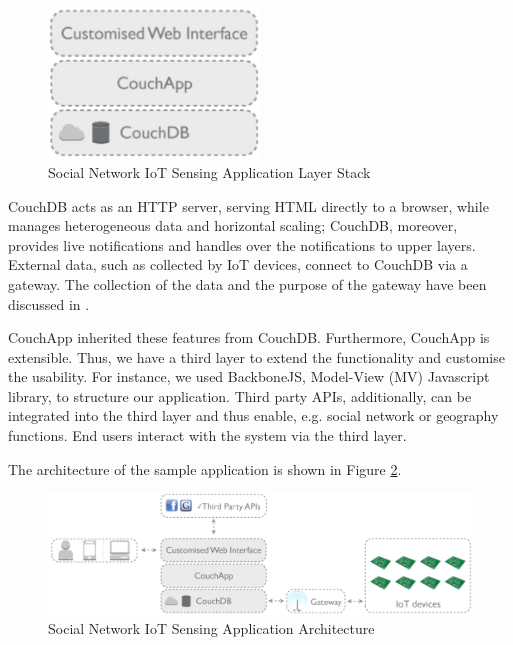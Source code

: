 \begin{figure}[ht]
  \begin{center}
    \includegraphics[width=0.5\textwidth]{images/data-centre-app-stack.pdf}
    \caption{Social Network IoT Sensing Application Layer Stack}
    \label{fig:data-centre-app-stack}
  \end{center}
\end{figure}

CouchDB acts as an HTTP server, serving HTML directly to a browser, while manages heterogeneous data and horizontal scaling; CouchDB, moreover, provides live notifications and handles over the notifications to upper layers. External data, such as collected by IoT devices, connect to CouchDB via a gateway. The collection of the data and the purpose of the gateway have been discussed in \cite{francesco2012storage}. 

CouchApp inherited these features from CouchDB. Furthermore, CouchApp is extensible. Thus, we have a third layer to extend the functionality and customise the usability. For instance, we used BackboneJS, Model-View (MV) Javascript library, to structure our application. Third party APIs, additionally, can be integrated into the third layer and thus enable, e.g. social network or geography functions. End users interact with the system via the third layer. 

The architecture of the sample application is shown in Figure \ref{fig:data-centre-architecture}.

\begin{figure}[ht]
  \begin{center}
    \includegraphics[width=1\textwidth]{images/data-centre-architecture.pdf}
    \caption{Social Network IoT Sensing Application Architecture}
    \label{fig:data-centre-architecture}
  \end{center}
\end{figure}


